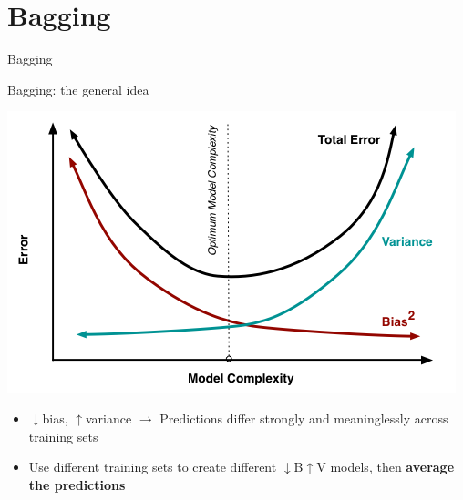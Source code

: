 \documentclass[xcolor=table,aspectratio=169]{beamer}
\begin{document}
\section{Bagging}
\begin{frame}
	Bagging
\end{frame}

\begin{frame}
	{Bagging: the general idea}
	
	\includegraphics[width=.5\textwidth]{pics/biasvariance.png}
	
	\begin{itemize}
		\item $\downarrow$bias, $\uparrow$variance $\rightarrow$ Predictions differ strongly and meaninglessly across training sets
		\item[\textbf{IDEA}] Use different training sets to create different $\downarrow$B$\uparrow$V models, then \textbf{average the predictions}
	\end{itemize}
\end{frame}
\end{document}
